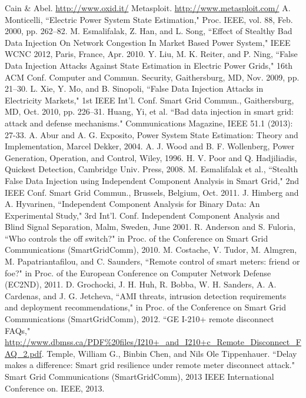 \documentclass[11pt,oneside]{book}
\begin{document}
\begin{thebibliography}{99}
 Cain \& Abel. \url{http://www.oxid.it/}
 Metasploit. \url{http://www.metasploit.com/}
 A. Monticelli, ``Electric Power System State Estimation," Proc. IEEE, vol. 88, Feb. 2000, pp. 262–82.
 M. Esmalifalak, Z. Han, and L. Song, ``Effect of Stealthy Bad Data Injection On Network Congestion In Market Based Power System," IEEE WCNC 2012, Paris, France, Apr. 2010.
 Y. Liu, M. K. Reiter, and P. Ning, ``False Data Injection Attacks Against State Estimation in Electric Power Grids," 16th ACM Conf. Computer and Commun. Security, Gaithersburg, MD, Nov. 2009, pp. 21–30.
 L. Xie, Y. Mo, and B. Sinopoli, ``False Data Injection Attacks in Electricity Markets," 1st IEEE Int’l. Conf. Smart Grid Commun., Gaithersburg, MD, Oct. 2010, pp. 226–31.
 Huang, Yi, et al. ``Bad data injection in smart grid: attack and defense mechanisms." Communications Magazine, IEEE 51.1 (2013): 27-33.
 A. Abur and A. G. Exposito, Power System State Estimation: Theory and Implementation, Marcel Dekker, 2004.
 A. J. Wood and B. F. Wollenberg, Power Generation, Operation, and Control, Wiley, 1996.
 H. V. Poor and Q. Hadjiliadis, Quickest Detection, Cambridge Univ. Press, 2008.
 M. Esmalifalak et al., ``Stealth False Data Injection using Independent Component Analysis in Smart Grid," 2nd IEEE Conf. Smart Grid Commun., Brussels, Belgium, Oct. 2011.
 J. Himberg and A. Hyvarinen, ``Independent Component Analysis for Binary Data: An Experimental Study," 3rd Int’l. Conf. Independent Component Analysis and Blind Signal Separation, Malm, Sweden, June 2001.
 R. Anderson and S. Fuloria, ``Who controls the off switch?" in Proc. of the Conference on Smart Grid Communications (SmartGridComm), 2010.
 M. Costache, V. Tudor, M. Almgren, M. Papatriantafilou, and C. Saunders, ``Remote control of smart meters: friend or foe?" in Proc. of the European Conference on Computer Network Defense (EC2ND), 2011.
 D. Grochocki, J. H. Huh, R. Bobba, W. H. Sanders, A. A. Cardenas, and J. G. Jetcheva, ``AMI threats, intrusion detection requirements and deployment recommendations," in Proc. of the Conference on Smart Grid Communications (SmartGridComm), 2012.
 ``GE I-210+ remote disconnect FAQs," \url{http://www.dbmss.ca/PDF\%20files/I210+_and_I210+c_Remote_Disconnect_FAQ_2.pdf}.
 Temple, William G., Binbin Chen, and Nils Ole Tippenhauer. ``Delay makes a difference: Smart grid resilience under remote meter disconnect attack." Smart Grid Communications (SmartGridComm), 2013 IEEE International Conference on. IEEE, 2013.

\end{thebibliography}
\end{document}
